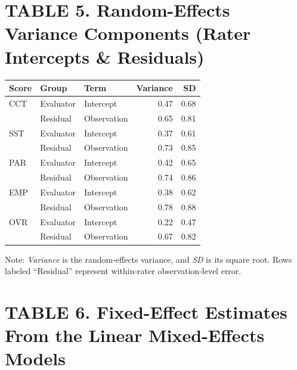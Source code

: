 \documentclass{wiley-article}
\begin{document}
\begin{table}[H] %
  \section*{TABLE 5. Random-Effects Variance Components (Rater Intercepts \& Residuals)}
  \centering
  \footnotesize
  \begin{threeparttable}
    \label{tab:random_effects}
    \begin{tabular}{lllr r}
      \toprule
      \textbf{Score} & \textbf{Group} & \textbf{Term} & \textbf{Variance} & \textbf{SD} \\
      \midrule
      CCT & Evaluator & Intercept   & 0.47 & 0.68 \\
          & Residual  & Observation & 0.65 & 0.81 \\
      \addlinespace
      SST & Evaluator & Intercept   & 0.37 & 0.61 \\
          & Residual  & Observation & 0.73 & 0.85 \\
      \addlinespace
      PAR & Evaluator & Intercept   & 0.42 & 0.65 \\
          & Residual  & Observation & 0.74 & 0.86 \\
      \addlinespace
      EMP & Evaluator & Intercept   & 0.38 & 0.62 \\
          & Residual  & Observation & 0.78 & 0.88 \\
      \addlinespace
      OVR & Evaluator & Intercept   & 0.22 & 0.47 \\
          & Residual  & Observation & 0.67 & 0.82 \\
      \bottomrule
    \end{tabular}
    \begin{tablenotes}
      \scriptsize
      \item Note: \textit{Variance} is the random‐effects variance, and \textit{SD} is its square root. Rows labeled “Residual” represent within‐rater observation‐level error.
    \end{tablenotes}
  \end{threeparttable}
\end{table}


\clearpage
\section*{TABLE 6. Fixed-Effect Estimates From the Linear Mixed-Effects Models}
\end{document}
